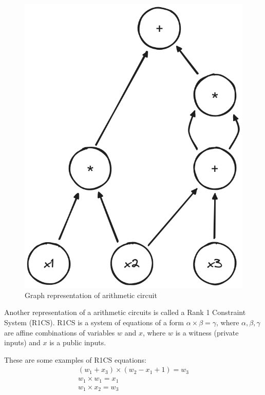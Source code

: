 \begin{figure}[h]
    \centering
    \includegraphics[scale=0.25]{assets/images/dag_example.png}
    \caption{Graph representation of arithmetic circuit}
    \label{fig:dag_example}
    \vspace{0.5cm}
\end{figure}

Another representation of a arithmetic circuits is called a Rank 1 Constraint
System (R1CS). R1CS is a system of equations of a form $\alpha \times \beta = \gamma$,
where $\alpha, \beta, \gamma$ are affine combinations of variables $w$ and $x$,
where $w$ is a witness (private inputs) and $x$ is a public inputs.

These are some examples of R1CS equations:
\begin{displaymath}
    \begin{array}{l}
        (w_1 + x_3) \times (w_2 - x_1 + 1) = w_3 \\
        w_1 \times w_1 = x_1                     \\
        w_1 \times x_2 = w_3
    \end{array}
\end{displaymath}


